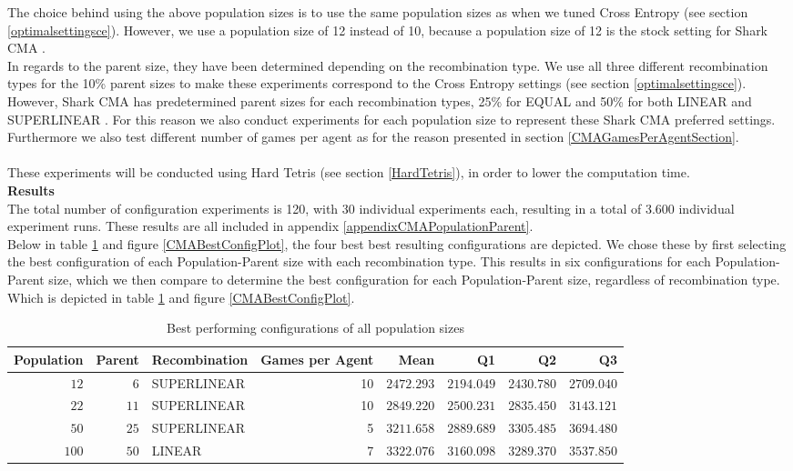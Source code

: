 The choice behind using the above population sizes is to use the same population sizes as
when we tuned Cross Entropy (see section \ref{optimalsettingsce}). However, we use a population
size of 12 instead of 10, because a population size of 12 is the stock setting for Shark CMA \citep{shark08}.\\
In regards to the parent size, they have been determined depending on the recombination type.
We use all three different recombination types for the 10\% parent sizes to make these experiments
correspond to the Cross Entropy settings (see section \ref{optimalsettingsce}). However, Shark CMA
has predetermined parent sizes for each recombination types, 25\% for EQUAL and 50\% for both
LINEAR and SUPERLINEAR \citep{shark08}. For this reason we also conduct experiments for each population
size to represent these Shark CMA preferred settings.
Furthermore we also test different number of games per agent as for the reason presented in section \ref{CMAGamesPerAgentSection}.\\\\
These experiments will be conducted using Hard Tetris (see section \ref{HardTetris}), in order
to lower the computation time.\\

\textbf{Results}\\
The total number of configuration experiments is 120, with 30 individual experiments each,
resulting in a total of 3.600 individual experiment runs. These results are all included in 
appendix \ref{appendixCMAPopulationParent}.\\
Below in table \ref{CMABestConfigTable} and figure \ref{CMABestConfigPlot}, the four best
best resulting configurations are depicted. We chose these by first selecting the best 
configuration of each Population-Parent size with each recombination type. This results in six
configurations for each Population-Parent size, which we then compare to determine the best
configuration for each Population-Parent size, regardless of recombination type. Which is depicted in table \ref{CMABestConfigTable} and figure \ref{CMABestConfigPlot}.

\begin{table}[H]
\centering
\small
\begin{tabular}{r r l r r r r r}
Population & Parent & Recombination & Games per Agent & Mean & Q1 & Q2 & Q3\\
\hline
$12$ & $6$  & SUPERLINEAR & 10 & $2472.293$ & $2194.049$ & $2430.780$ & $2709.040$\\
$22$ & $11$ & SUPERLINEAR & 10 & $2849.220$ & $2500.231$ & $2835.450$ & $3143.121$\\
$50$ & $25$ & SUPERLINEAR & 5  & $3211.658$ & $2889.689$ & $3305.485$ & $3694.480$\\
$100$ & $50$ & LINEAR     & 7  & $3322.076$ & $3160.098$ & $3289.370$ & $3537.850$
\end{tabular}
\caption{Best performing configurations of all population sizes \label{CMABestConfigTable}}
\end{table}


